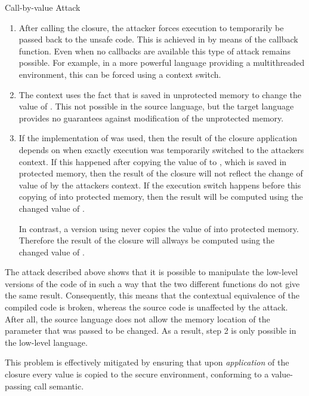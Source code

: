 \begin{attack}{Call-by-value Attack}
\begin{enumerate}
\item After calling the closure, the attacker forces execution to temporarily be passed back to the unsafe code.
This is achieved in  by means of the callback function. 
Even when no callbacks are available this type of attack remains possible. For example, in a more powerful language providing a multithreaded environment, this can be forced using a context switch.
\item The context uses the fact that  is saved in unprotected memory to change the value of . This not possible in the source language, but the target language provides no guarantees against modification of the unprotected memory.
\item If the implementation of  was used, then the result of the closure application depends on when exactly execution was temporarily switched to the attackers context.
If this happened after copying the value of  to , which is saved in protected memory, then the result of the closure will not reflect the change of value of  by the attackers context.
If the execution switch happens before this copying of  into protected memory, then the result will be computed using the changed value of .

In contrast, a version using   never copies the value of  into protected memory. 
Therefore the result of the closure will allways be computed using the changed value of .
\end{enumerate}
\end{attack}


The attack described above shows that it is possible to manipulate the low-level versions of the code of  in such a way that the two different functions do not give the same result. 
Consequently, this means that the contextual equivalence of the compiled code is broken, whereas the source code is unaffected by the attack.
After all, the source language does not allow the memory location of the parameter that was passed to be changed. As a result, step 2 is only possible in the low-level language.

This problem is effectively mitigated by ensuring that upon \emph{application} of the closure every value is copied to the secure environment, conforming to a value-passing call semantic.

